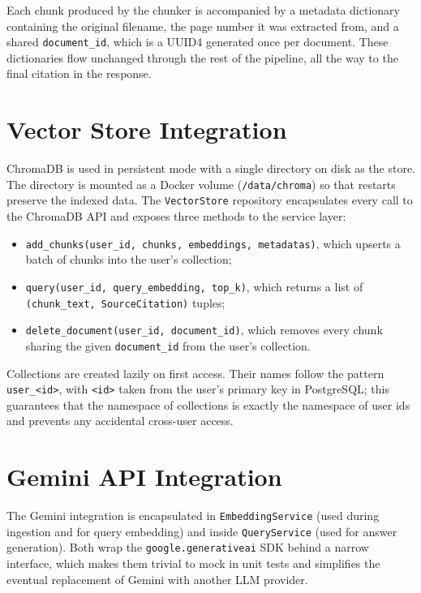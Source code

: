 Each chunk produced by the chunker is accompanied by a metadata
dictionary containing the original filename, the page number it was
extracted from, and a shared \texttt{document\_id}, which is a UUID4
generated once per document. These dictionaries flow unchanged through
the rest of the pipeline, all the way to the final citation in the
response.

\section{Vector Store Integration}
\label{sec:vector-store-impl}

ChromaDB is used in persistent mode with a single directory on disk as
the store. The directory is mounted as a Docker volume
(\texttt{/data/chroma}) so that restarts preserve the indexed data. The
\texttt{VectorStore} repository encapsulates every call to the ChromaDB
API and exposes three methods to the service layer:

\begin{itemize}
  \item \texttt{add\_chunks(user\_id, chunks, embeddings, metadatas)},
        which upserts a batch of chunks into the user's collection;
  \item \texttt{query(user\_id, query\_embedding, top\_k)}, which
        returns a list of \texttt{(chunk\_text, SourceCitation)} tuples;
  \item \texttt{delete\_document(user\_id, document\_id)}, which
        removes every chunk sharing the given \texttt{document\_id}
        from the user's collection.
\end{itemize}

Collections are created lazily on first access. Their names follow the
pattern \texttt{user\_<id>}, with \texttt{<id>} taken from the user's
primary key in PostgreSQL; this guarantees that the namespace of
collections is exactly the namespace of user ids and prevents any
accidental cross-user access.

\section{Gemini API Integration}
\label{sec:gemini-integration-impl}

The Gemini integration is encapsulated in \texttt{EmbeddingService}
(used during ingestion and for query embedding) and inside
\texttt{QueryService} (used for answer generation). Both wrap the
\texttt{google.generativeai} SDK behind a narrow interface, which makes
them trivial to mock in unit tests and simplifies the eventual
replacement of Gemini with another LLM provider.

